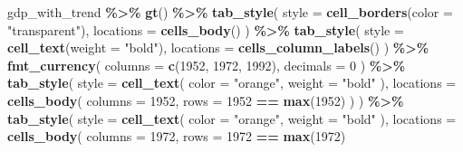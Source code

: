 \documentclass[
]{book}
\newenvironment{Shaded}{\begin{snugshade}}{\end{snugshade}}
\newcommand{\AttributeTok}[1]{\textcolor[rgb]{0.13,0.29,0.53}{#1}}
\newcommand{\DecValTok}[1]{\textcolor[rgb]{0.00,0.00,0.81}{#1}}
\newcommand{\FunctionTok}[1]{\textcolor[rgb]{0.13,0.29,0.53}{\textbf{#1}}}
\newcommand{\NormalTok}[1]{#1}
\newcommand{\SpecialCharTok}[1]{\textcolor[rgb]{0.81,0.36,0.00}{\textbf{#1}}}
\newcommand{\StringTok}[1]{\textcolor[rgb]{0.31,0.60,0.02}{#1}}
\begin{document}
\begin{Shaded}
\begin{Highlighting}[]
\NormalTok{gdp\_with\_trend }\SpecialCharTok{\%\textgreater{}\%}
  \FunctionTok{gt}\NormalTok{() }\SpecialCharTok{\%\textgreater{}\%}
  \FunctionTok{tab\_style}\NormalTok{(}
    \AttributeTok{style =} \FunctionTok{cell\_borders}\NormalTok{(}\AttributeTok{color =} \StringTok{"transparent"}\NormalTok{),}
    \AttributeTok{locations =} \FunctionTok{cells\_body}\NormalTok{()}
\NormalTok{  ) }\SpecialCharTok{\%\textgreater{}\%}
  \FunctionTok{tab\_style}\NormalTok{(}
    \AttributeTok{style =} \FunctionTok{cell\_text}\NormalTok{(}\AttributeTok{weight =} \StringTok{"bold"}\NormalTok{),}
    \AttributeTok{locations =} \FunctionTok{cells\_column\_labels}\NormalTok{()}
\NormalTok{  ) }\SpecialCharTok{\%\textgreater{}\%}
  \FunctionTok{fmt\_currency}\NormalTok{(}
    \AttributeTok{columns =} \FunctionTok{c}\NormalTok{(}\StringTok{\textasciigrave{}}\AttributeTok{1952}\StringTok{\textasciigrave{}}\NormalTok{, }\StringTok{\textasciigrave{}}\AttributeTok{1972}\StringTok{\textasciigrave{}}\NormalTok{, }\StringTok{\textasciigrave{}}\AttributeTok{1992}\StringTok{\textasciigrave{}}\NormalTok{),}
    \AttributeTok{decimals =} \DecValTok{0}
\NormalTok{  ) }\SpecialCharTok{\%\textgreater{}\%}
  \FunctionTok{tab\_style}\NormalTok{(}
    \AttributeTok{style =} \FunctionTok{cell\_text}\NormalTok{(}
      \AttributeTok{color =} \StringTok{"orange"}\NormalTok{,}
      \AttributeTok{weight =} \StringTok{"bold"}
\NormalTok{    ),}
    \AttributeTok{locations =} \FunctionTok{cells\_body}\NormalTok{(}
      \AttributeTok{columns =} \StringTok{\textasciigrave{}}\AttributeTok{1952}\StringTok{\textasciigrave{}}\NormalTok{,}
      \AttributeTok{rows =} \StringTok{\textasciigrave{}}\AttributeTok{1952}\StringTok{\textasciigrave{}} \SpecialCharTok{==} \FunctionTok{max}\NormalTok{(}\StringTok{\textasciigrave{}}\AttributeTok{1952}\StringTok{\textasciigrave{}}\NormalTok{)}
\NormalTok{    )}
\NormalTok{  ) }\SpecialCharTok{\%\textgreater{}\%}
  \FunctionTok{tab\_style}\NormalTok{(}
    \AttributeTok{style =} \FunctionTok{cell\_text}\NormalTok{(}
      \AttributeTok{color =} \StringTok{"orange"}\NormalTok{,}
      \AttributeTok{weight =} \StringTok{"bold"}
\NormalTok{    ),}
    \AttributeTok{locations =} \FunctionTok{cells\_body}\NormalTok{(}
      \AttributeTok{columns =} \StringTok{\textasciigrave{}}\AttributeTok{1972}\StringTok{\textasciigrave{}}\NormalTok{,}
      \AttributeTok{rows =} \StringTok{\textasciigrave{}}\AttributeTok{1972}\StringTok{\textasciigrave{}} \SpecialCharTok{==} \FunctionTok{max}\NormalTok{(}\StringTok{\textasciigrave{}}\AttributeTok{1972}\StringTok{\textasciigrave{}}\NormalTok{)}

\end{Highlighting}
\end{Shaded}
\end{document}
